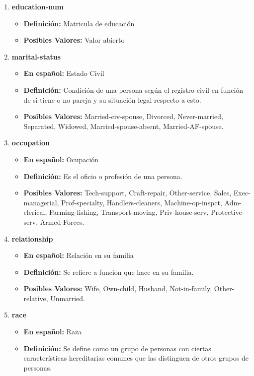 \documentclass{article}
\begin{document}
\begin{enumerate}
\begin{itemize}
     \end{itemize}
     \item \textbf{education-num}
     \begin{itemize}
       \item \textbf{Definición:} Matricula de educación
       \item \textbf{Posibles Valores:}  Valor abierto
     \end{itemize}
     \item \textbf{marital-status}
     \begin{itemize}
       \item \textbf{En español:} Estado Civil
       \item \textbf{Definición:} Condición de una persona según el registro civil en función de si tiene o no pareja y su situación legal respecto a esto.
       \item \textbf{Posibles Valores:}  Married-civ-spouse, Divorced, Never-married, Separated, Widowed, Married-spouse-absent, Married-AF-spouse.
     \end{itemize}
     \item \textbf{occupation}
     \begin{itemize}
       \item \textbf{En español:} Ocupación
       \item \textbf{Definición:} Es el oficio o profesión de una persona.
       \item \textbf{Posibles Valores:}  Tech-support, Craft-repair, Other-service, Sales, Exec-managerial, Prof-specialty, Handlers-cleaners, Machine-op-inspct, Adm-clerical, Farming-fishing, Transport-moving, Priv-house-serv, Protective-serv, Armed-Forces.
     \end{itemize}
     \item \textbf{relationship}
     \begin{itemize}
       \item \textbf{En español:} Relación en su familia
       \item \textbf{Definición:} Se refiere a funcion que hace en su familia.
       \item \textbf{Posibles Valores:} Wife, Own-child, Husband, Not-in-family, Other-relative, Unmarried.
     \end{itemize}
     \item \textbf{race}
     \begin{itemize}
       \item \textbf{En español:} Raza
       \item \textbf{Definición:} Se define como un grupo de personas con ciertas características hereditarias comunes que las distinguen de otros grupos de personas.

\end{itemize}
\end{enumerate}
\end{document}
